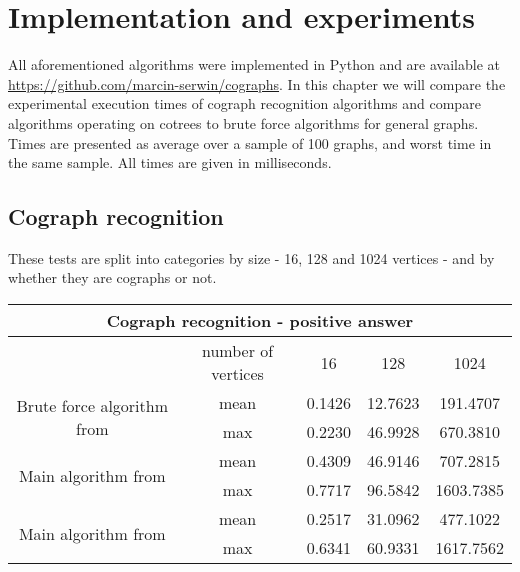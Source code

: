\chapter{Implementation and experiments}

All aforementioned algorithms were implemented in Python and are available at \url{https://github.com/marcin-serwin/cographs}. In this chapter we will compare the experimental execution times of cograph recognition algorithms and compare algorithms operating on cotrees to brute force algorithms for general graphs. Times are presented as average over a sample of 100 graphs, and worst time in the same sample. All times are given in milliseconds.

\section{Cograph recognition}
These tests are split into categories by size - 16, 128 and 1024 vertices - and by whether they are cographs or not.

\begin{center}

    \begin{tabular}{ |c|c|c|c|c|}
        \hline
        \multicolumn{5}{|c|}{Cograph recognition - positive answer}                                                  \\
        \hline
                                                                 & number of vertices & 16     & 128     & 1024      \\
        \hline
        \multirow{2}{*}{Brute force algorithm from \cite{habib}} & mean               & 0.1426 & 12.7623 & 191.4707  \\
                                                                 & max                & 0.2230 & 46.9928 & 670.3810  \\
        \hline
        \multirow{2}{*}{Main algorithm from \cite{habib}}        & mean               & 0.4309 & 46.9146 & 707.2815  \\
                                                                 & max                & 0.7717 & 96.5842 & 1603.7385 \\
        \hline
        \multirow{2}{*}{Main algorithm from \cite{corneil}}      & mean               & 0.2517 & 31.0962 & 477.1022  \\
                                                                 & max                & 0.6341 & 60.9331 & 1617.7562 \\
        \hline
    \end{tabular}
\end{center}

